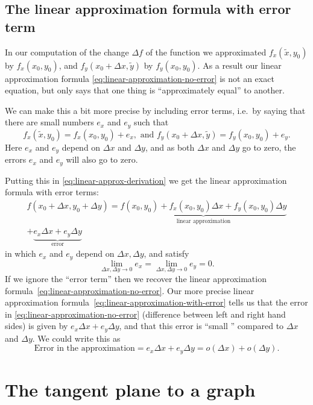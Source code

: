 \subsection{The linear approximation formula with error term}
\label{sec:linear-approximation-with-error}%
In our computation of the change $\Delta f$ of the function we approximated
$f_x(\tilde{x}, y_0)$ by $f_x(x_0, y_0)$, and $f_y(x_0+\Delta x, \tilde{y})$ by
$f_y(x_0, y_0)$.  As a result our linear approximation formula
\eqref{eq:linear-approximation-no-error} is not an exact equation, but only says
that one thing is ``approximately equal'' to another.

We can make this a bit more precise by including error terms, i.e.~by saying
that there are small numbers $e_x$ and $e_y$ such that
\[
f_x(\tilde{x}, y_0) = f_x(x_0, y_0) + e_x, \text{ and } f_y(x_0+\Delta x,
\tilde{y}) = f_y(x_0, y_0) + e_y.
\]
Here $e_x$ and $e_y$ depend on $\Delta x$ and $\Delta y$, and as both $\Delta x$
and $\Delta y$ go to zero, the errors $e_x$ and $e_y$ will also go to zero.

Putting this in \eqref{eq:linear-approx-derivation} we get the linear
approximation formula with error terms:
\begin{multline}
  \label{eq:linear-approximation-with-error}
  f(x_0+\Delta x, y_0+\Delta y) = \underbrace{f(x_0, y_0)+f_x(x_0, y_0)\Delta x
    + f_y(x_0, y_0) \Delta y}_{\text{linear approximation}}\\
  + \underbrace{e_x\Delta x + e_y \Delta y}_{\text{error}}
\end{multline}
in which $e_x$ and $e_y$ depend on $\Delta x, \Delta y$, and satisfy
\[
\lim_{\Delta x, \Delta y \to 0} e_x = \lim_{\Delta x, \Delta y \to 0} e_y = 0.
\]
If we ignore the ``error term'' then we recover the linear approximation
formula~\eqref{eq:linear-approximation-no-error}.  Our more precise linear
approximation formula~\eqref{eq:linear-approximation-with-error} tells us that
the error in \eqref{eq:linear-approximation-no-error} (difference between left
and right hand sides) is given by $e_x\Delta x+ e_y \Delta y$, and that this
error is ``small '' compared to $\Delta x$ and $\Delta y$.  We could write this
as
\[
\text{Error in the approximation} = e_x\Delta x+ e_y \Delta y = o(\Delta x) +
o(\Delta y).
\]



\section{The tangent plane to a graph}\label{sec:the-tangent-plane}
